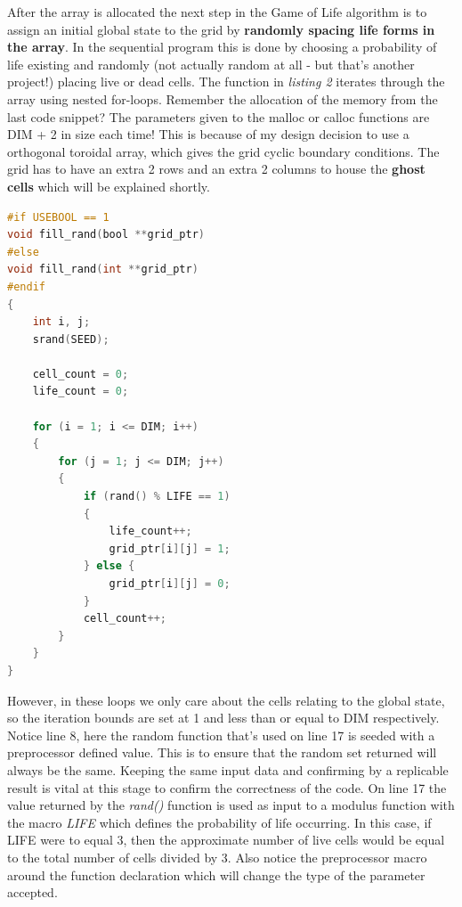 \documentclass[11pt]{article} %
\begin{document}
\smallskip
After the array is allocated the next step in the Game of Life algorithm is to assign an initial global state to the grid by {\bf randomly spacing life forms in the array}. In the sequential program this is done by choosing a probability of life existing and randomly (not actually random at all - but that's another project!) placing live or dead cells. The function in {\it listing 2} iterates through the array using nested for-loops. Remember the allocation of the memory from the last code snippet? The parameters given to the malloc or calloc functions are DIM + 2 in size each time! This is because of my design decision to use a orthogonal toroidal array, which gives the grid cyclic boundary conditions. The grid has to have an extra 2 rows and an extra 2 columns to house the {\bf ghost cells} which will be explained shortly.
\begin{lstlisting}[language=C,caption={Randomly spacing lifeforms in the array}, morekeywords={malloc,calloc,bool}]
#if USEBOOL == 1
void fill_rand(bool **grid_ptr)
#else
void fill_rand(int **grid_ptr)
#endif
{
	int i, j;
	srand(SEED);

	cell_count = 0;
	life_count = 0;

	for (i = 1; i <= DIM; i++)
	{
		for (j = 1; j <= DIM; j++)
		{
			if (rand() % LIFE == 1)
			{
				life_count++;
				grid_ptr[i][j] = 1;
			} else {
				grid_ptr[i][j] = 0;
			}
			cell_count++;
		}
	}
}
\end{lstlisting}
However, in these loops we only care about the cells relating to the global state, so the iteration bounds are set at 1 and less than or equal to DIM respectively. Notice line 8, here the random function that's used on line 17 is seeded with a preprocessor defined value. This is to ensure that the random set returned will always be the same. Keeping the same input data and confirming by a replicable result is vital at this stage to confirm the correctness of the code. On line 17 the value returned by the {\it rand()} function is used as input to a modulus function with the macro {\it LIFE} which defines the probability of life occurring. In this case, if LIFE were to equal 3, then the approximate number of live cells would be equal to the total number of cells divided by 3. Also notice the preprocessor macro around the function declaration which will change the type of the parameter accepted.\\
\end{document}
